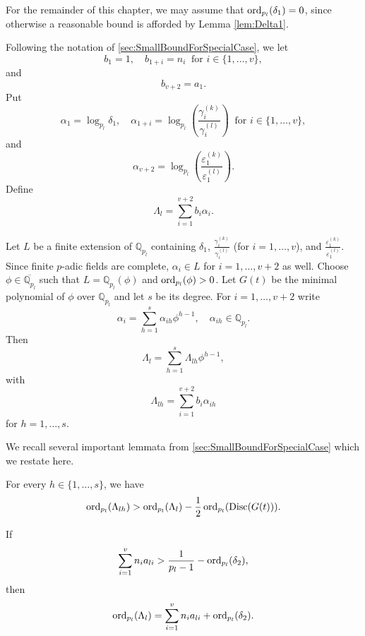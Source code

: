 For the remainder of this chapter, we may assume that $\operatorname{ord}_{p_l}(\delta_1) = 0$, since otherwise a reasonable bound is afforded by Lemma \ref{lem:Delta1}. 

Following the notation of \autoref{sec:SmallBoundForSpecialCase}, we let
\[b_1 = 1, \quad b_{1+i} = n_i \ \text{ for } i \in \{1, \dots, v\},\]
and
\[ b_{v+2} = a_1.\]
Put
\[\alpha_1 = \log_{p_l} \delta_1, \quad \alpha_{1+i} = \log_{p_l}\left( \frac{\gamma_i^{(k)}}{\gamma_i^{(l)}}\right)  \ \text{ for } i \in \{1, \dots, v\},\]
and
\[\alpha_{v+2} = \log_{p_l}\left( \frac{\varepsilon_1^{(k)}}{\varepsilon_1^{(l)}}\right).\]
Define
\[\Lambda_l = \sum_{i = 1}^{v+2} b_i\alpha_i.\]

Let $L$ be a finite extension of $\mathbb{Q}_{p_l}$ containing $\delta_1$, $\frac{\gamma_i^{(k)}}{\gamma_i^{(l)}}$ (for $i = 1, \dots, v$), and $ \frac{\varepsilon_1^{(k)}}{\varepsilon_1^{(l)}}$. Since finite $p$-adic fields are complete, $\alpha_i \in L$ for $i = 1, \dots, v+2$ as well. Choose $\phi \in \overline{\mathbb{Q}_{p_l}}$ such that $L = \mathbb{Q}_{p_l}(\phi)$ and $\operatorname{ord}_{p_l}(\phi) > 0 $. Let $G(t)$ be the minimal polynomial of $\phi$ over $\mathbb{Q}_{p_l}$ and let $s$ be its degree. For $i = 1, \dots, v+2$ write
\[\alpha_i = \sum_{h = 1}^s \alpha_{ih}\phi^{h - 1}, \quad \alpha_{ih} \in \mathbb{Q}_{p_l}.\]
Then
\begin{equation} \label{Eq:lambdalh}
\Lambda_l = \sum_{h = 1}^s \Lambda_{lh}\phi^{h-1},
\end{equation}
with
\[\Lambda_{lh} = \sum_{i = 1}^{v+2} b_i \alpha_{ih}\]
for $h = 1, \dots, s$. 

We recall several important lemmata from \autoref{sec:SmallBoundForSpecialCase} which we restate here.
\begin{lemma}\label{Lem:discG}
For every $h \in \{1, \dots, s\}$, we have
\[\operatorname{ord}_{p_l}(\Lambda_{lh}) > \operatorname{ord}_{p_l}(\Lambda_l) - \frac{1}{2}\operatorname{ord}_{p_l}(\text{Disc}(G(t))).\]
\end{lemma}

\begin{lemma} \label{Lem:Lambda}
If 
\[\sum_{i = 1}^v n_{i}a_{li} > \frac{1}{p_l-1} - \operatorname{ord}_{p_l}(\delta_2),\]
then
\[\operatorname{ord}_{p_l}(\Lambda_l) = \sum_{i = 1}^v n_{i}a_{li} + \operatorname{ord}_{p_l}(\delta_2).\]
\end{lemma}

